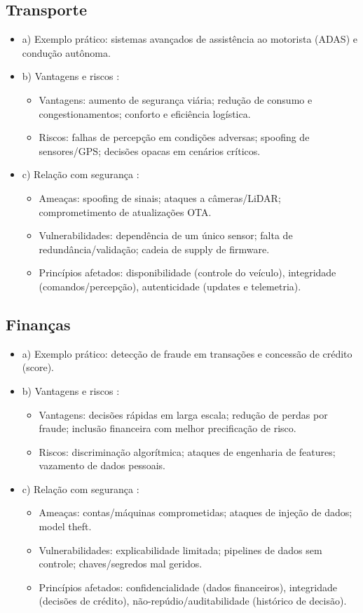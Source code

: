 \documentclass[a4paper,12pt]{article}
\begin{document}
\subsection{Transporte}
\begin{itemize}
\item a) Exemplo prático: sistemas avançados de assistência ao motorista (ADAS) e condução autônoma.
\item b) Vantagens e riscos \cite{oecd2019}:
  \begin{itemize}
  \item Vantagens: aumento de segurança viária; redução de consumo e congestionamentos; conforto e eficiência logística.
  \item Riscos: falhas de percepção em condições adversas; spoofing de sensores/GPS; decisões opacas em cenários críticos.
  \end{itemize}
\item c) Relação com segurança \cite{stallings1999}:
  \begin{itemize}
  \item Ameaças: spoofing de sinais; ataques a câmeras/LiDAR; comprometimento de atualizações OTA.
  \item Vulnerabilidades: dependência de um único sensor; falta de redundância/validação; cadeia de supply de firmware.
  \item Princípios afetados: disponibilidade (controle do veículo), integridade (comandos/percepção), autenticidade (updates e telemetria).
  \end{itemize}
\end{itemize}

\subsection{Finanças}
\begin{itemize}
\item a) Exemplo prático: detecção de fraude em transações e concessão de crédito (score).
\item b) Vantagens e riscos \cite{oecd2019}:
  \begin{itemize}
  \item Vantagens: decisões rápidas em larga escala; redução de perdas por fraude; inclusão financeira com melhor precificação de risco.
  \item Riscos: discriminação algorítmica; ataques de engenharia de features; vazamento de dados pessoais.
  \end{itemize}
\item c) Relação com segurança \cite{stallings1999}:
  \begin{itemize}
  \item Ameaças: contas/máquinas comprometidas; ataques de injeção de dados; model theft.
  \item Vulnerabilidades: explicabilidade limitada; pipelines de dados sem controle; chaves/segredos mal geridos.
  \item Princípios afetados: confidencialidade (dados financeiros), integridade (decisões de crédito), não-repúdio/auditabilidade (histórico de decisão).
  \end{itemize}
\end{itemize}
\end{document}

